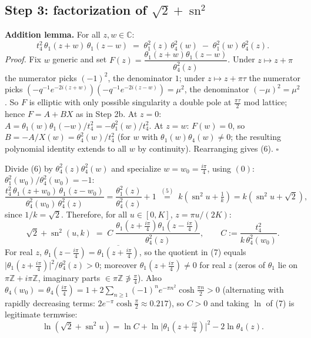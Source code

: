 \documentclass[11pt]{article}
\theoremstyle{remark}
\begin{document}
\subsection*{Step 3: factorization of $\sqrt2+\operatorname{sn}^2$}

\textbf{Addition lemma.} For all $z,w\in\mathbb C$:
\begin{equation*}
t_4^2\,\theta_1(z+w)\,\theta_1(z-w)\;=\;\theta_1^2(z)\,\theta_4^2(w)\;-\;\theta_1^2(w)\,\theta_4^2(z). \tag{6}
\end{equation*}
\textit{Proof.} Fix $w$ generic and set $F(z)=\dfrac{\theta_1(z+w)\theta_1(z-w)}{\theta_4^2(z)}$. Under $z\mapsto z+\pi$ the numerator picks $(-1)^2$, the denominator $1$; under $z\mapsto z+\pi\tau$ the numerator picks $(-q^{-1}e^{-2i(z+w)})(-q^{-1}e^{-2i(z-w)})=\mu^2$, the denominator $(-\mu)^2=\mu^2$. So $F$ is elliptic with only possible singularity a double pole at $\tfrac{\pi\tau}2$ mod lattice; hence $F=A+BX$ as in Step 2b. At $z=0$: $A=\theta_1(w)\theta_1(-w)/t_4^2=-\theta_1^2(w)/t_4^2$. At $z=w$: $F(w)=0$, so $B=-A/X(w)=\theta_4^2(w)/t_4^2$ (for $w$ with $\theta_1(w)\theta_4(w)\neq0$; the resulting polynomial identity extends to all $w$ by continuity). Rearranging gives (6). $\square$

Divide (6) by $\theta_4^2(z)\theta_4^2(w)$ and specialize $w=w_0=\tfrac{i\pi}4$, using $(0)$: $\theta_1^2(w_0)/\theta_4^2(w_0)=-1$:
\[\frac{t_4^2\,\theta_1(z+w_0)\,\theta_1(z-w_0)}{\theta_4^2(w_0)\,\theta_4^2(z)}
=\frac{\theta_1^2(z)}{\theta_4^2(z)}+1
\;\overset{(5)}{=}\;k\left(\operatorname{sn}^2 u+\tfrac1k\right)=k\left(\operatorname{sn}^2u+\sqrt2\right),\]
since $1/k=\sqrt2$. Therefore, for all $u\in[0,K]$, $z=\pi u/(2K)$:
\begin{equation*}
\sqrt2+\operatorname{sn}^2(u,k)\;=\;C\;\frac{\theta_1\!\left(z+\tfrac{i\pi}4\right)\theta_1\!\left(z-\tfrac{i\pi}4\right)}{\theta_4^2(z)},
\qquad C:=\frac{t_4^2}{k\,\theta_4^2(w_0)} . \tag{7}
\end{equation*}
For real $z$, $\theta_1(z-\tfrac{i\pi}4)=\overline{\theta_1(z+\tfrac{i\pi}4)}$, so the quotient in (7) equals $\bigl|\theta_1(z+\tfrac{i\pi}4)\bigr|^2/\theta_4^2(z)>0$; moreover $\theta_1(z+\tfrac{i\pi}4)\neq0$ for real $z$ (zeros of $\theta_1$ lie on $\pi\mathbb Z+i\pi\mathbb Z$, imaginary parts $\in\pi\mathbb Z\not\ni\tfrac\pi4$). Also $\theta_4(w_0)=\theta_4(\tfrac{i\pi}{4})=1+2\sum_{n\ge1}(-1)^ne^{-\pi n^2}\cosh\tfrac{\pi n}{2}>0$ (alternating with rapidly decreasing terms: $2e^{-\pi}\cosh\tfrac\pi2\approx0.217$), so $C>0$ and taking $\ln$ of (7) is legitimate termwise:
\begin{equation*}
\ln\left(\sqrt2+\operatorname{sn}^2 u\right)=\ln C+\ln\bigl|\theta_1(z+\tfrac{i\pi}4)\bigr|^2-2\ln\theta_4(z). \tag{7$'$}
\end{equation*}
\end{document}
